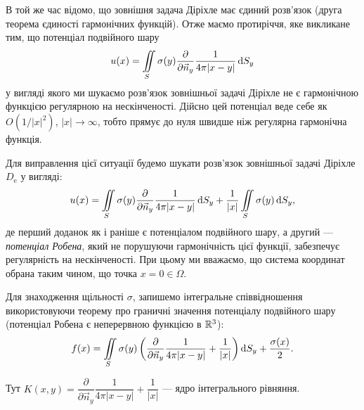 В той же час відомо, що зовнішня задача Діріхле має єдиний розв'язок (друга теорема єдиності гармонічних функцій). Отже маємо протиріччя, яке викликане тим, що потенціал подвійного шару
\begin{equation}
	u(x) = \displaystyle\iint\limits_S \sigma(y) \frac{\partial}{\partial \vec n_y} \frac{1}{4 \pi |x - y|} \mathop{}\!\mathrm{d} S_y
\end{equation}
у вигляді якого ми шукаємо розв'язок зовнішньої задачі Діріхле не є гармонічною функцією регулярною на нескінченості. Дійсно цей потенціал веде себе як $O(1/|x|^2)$, $|x| \to \infty$, тобто прямує до нуля швидше ніж регулярна гармонічна функція. \medskip

Для виправлення цієї ситуації будемо шукати розв'язок зовнішньої задачі Діріхле $D_{\text{e}}$ у вигляді:
\begin{equation}
	\label{eq:4.9.15}
	u(x) = \displaystyle\iint\limits_S \sigma(y) \frac{\partial}{\partial \vec n_y} \frac{1}{4 \pi |x - y|} \mathop{}\!\mathrm{d} S_y + \frac{1}{|x|} \displaystyle\iint\limits_S \sigma(y) \mathop{}\!\mathrm{d} S_y,
\end{equation}
де перший доданок як і раніше є потенціалом подвійного шару, а другий --- \textit{потенціал Робена}, який не порушуючи гармонічність цієї функції, забезпечує регулярність на нескінченості. При цьому ми вважаємо, що система координат обрана таким чином, що точка $x = 0 \in \Omega$. \medskip

Для знаходження щільності $\sigma$, запишемо інтегральне співвідношення використовуючи теорему про граничні значення потенціалу подвійного шару (потенціал Робена є неперервною функцією в $\mathbb{R}^3$):
\begin{equation}
	\label{eq:4.9.16}
	f(x) = \displaystyle\iint\limits_S \sigma(y) \left( \frac{\partial}{\partial \vec n_y} \frac{1}{4 \pi |x - y|} + \frac{1}{|x|} \right) \mathop{}\!\mathrm{d} S_y + \frac{\sigma(x)}{2}.
\end{equation}

Тут $K(x, y) = \dfrac{\partial}{\partial \vec n_y} \dfrac{1}{4 \pi |x - y|} + \dfrac{1}{|x|}$ --- ядро інтегрального рівняння. \medskip


